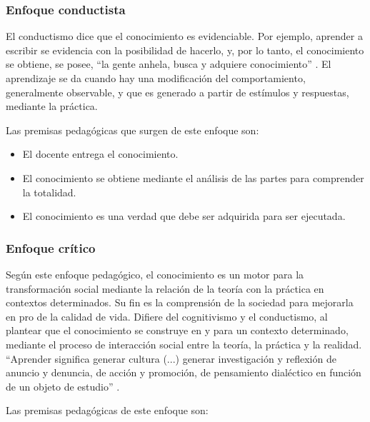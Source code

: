 \subsubsection*{Enfoque conductista}

El conductismo dice que el conocimiento es evidenciable. Por ejemplo, aprender a escribir se evidencia con la posibilidad de hacerlo, y, por lo tanto, el conocimiento se obtiene, se posee, “la gente anhela, busca y adquiere conocimiento” \cite[p.~126]{skinner1974sobre}. El aprendizaje se da cuando hay una modificación del comportamiento, generalmente observable, y que es generado a partir de estímulos y respuestas, mediante la práctica.

Las premisas pedagógicas que surgen de este enfoque son: 


\begin{itemize}
    
    \color{blue} \item \color{black} El docente entrega el conocimiento. 


    
     \color{blue} \item \color{black} El conocimiento se obtiene mediante el análisis de las partes para comprender la totalidad. 
     
    \color{blue} \item \color{black} El conocimiento es una verdad que debe ser adquirida para ser ejecutada. 
    \end{itemize}


\subsubsection*{Enfoque crítico}

Según este enfoque pedagógico, el conocimiento es un motor para la transformación social mediante la relación de la teoría con la práctica en contextos determinados. Su fin es la comprensión de la sociedad para mejorarla en pro de la calidad de vida. Difiere del cognitivismo y el conductismo, al plantear que el conocimiento se construye en y para un contexto determinado, mediante el proceso de interacción social entre la teoría, la práctica y la realidad. “Aprender significa generar cultura (...) generar investigación y reflexión de anuncio y denuncia, de acción y promoción, de pensamiento dialéctico en función de un objeto de estudio” \cite[p.~191]{ordonez2002pedagogia}. 

Las premisas pedagógicas de este enfoque son: 

